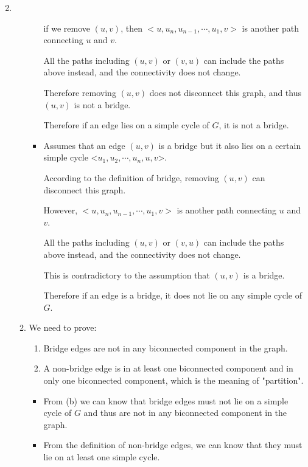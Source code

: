 \documentclass[12pt,a4paper]{article}
\makeatletter
\newtheorem*{solution}{Solution}
\theoremstyle{definition}
\renewenvironment{solution}[1][Solution] {\par\pushQED{\qed}\normalfont\topsep6\p@\@plus6\p@\relax\trivlist\item[\hskip\labelsep\bfseries#1\@addpunct{.}]\ignorespaces}{\popQED\endtrivlist\@endpefalse} \makeatother
\makeatother
\begin{document}
\begin{enumerate}
\begin{solution}
\begin{enumerate}
\begin{itemize}
    	        	    if we remove $(u,v)$, then $<u,u_n,u_{n-1},\cdots,u_1,v>$ is another path connecting $u$ and $v$.
    	        	    
    	        	    All the paths including $(u,v)$ or $(v,u)$ can include the paths above instead, and the connectivity does not change.
    	        	    
    	        	    Therefore removing $(u,v)$ does not disconnect this graph, and thus $(u,v)$ is not a bridge.
    	        	    
    	        	    Therefore if an edge lies on a simple cycle of $G$, it is not a bridge.
    	        	\item 
    	        	    Assumes that an edge $(u,v)$ is a bridge but it also lies on a certain simple cycle <$u_1,u_2,\cdots,u_{n},u,v$>.
    	        	    
    	        	    According to the definition of bridge, removing $(u,v)$ can disconnect this graph.
    	        	    
    	        	    However, $<u,u_n,u_{n-1},\cdots,u_1,v>$ is another path connecting $u$ and $v$.
    	        	    
    	        	    All the paths including $(u,v)$ or $(v,u)$ can include the paths above instead, and the connectivity does not change.
    	        	    
    	        	    This is contradictory to the assumption that $(u,v)$ is a bridge.
    	        	    
    	        	    Therefore if an edge is a bridge, it does not lie on any simple cycle of $G$.
    	        	    
    	        \end{itemize}
            \item 
                We need to prove:
                \begin{enumerate}
                	\item 
                	    Bridge edges are not in any biconnected component in the graph.
                	\item 
                	    A non-bridge edge is in at least one biconnected component and in only one biconnected component, which is the meaning of "partition".
                \end{enumerate}
                \begin{itemize}
                	\item 
                	    From (b) we can know that bridge edges must not lie on a simple cycle of $G$ and thus are not in any biconnected component in the graph.
                	\item 
                	    From the definition of non-bridge edges, we can know that they must lie on at least one simple cycle.
                	    

\end{itemize}
\end{enumerate}
\end{solution}
\end{enumerate}
\end{document}
